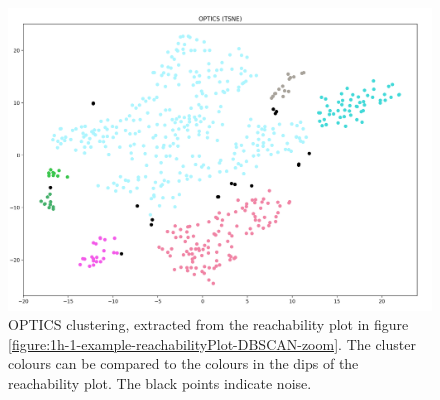 \begin{figure}
  \centering
  \includegraphics[width=1\textwidth]{./images/OPTICS/1h-1-example-OPTICS-DBSCAN-zoom.png}
  \caption{OPTICS clustering, extracted from the reachability plot in figure \ref{figure:1h-1-example-reachabilityPlot-DBSCAN-zoom}. The cluster colours can be compared to the colours in the dips of the reachability plot. The black points indicate noise.}
  \label{figure:1h-1-example-OPTICS-DBSCAN-zoom}
\end{figure}




